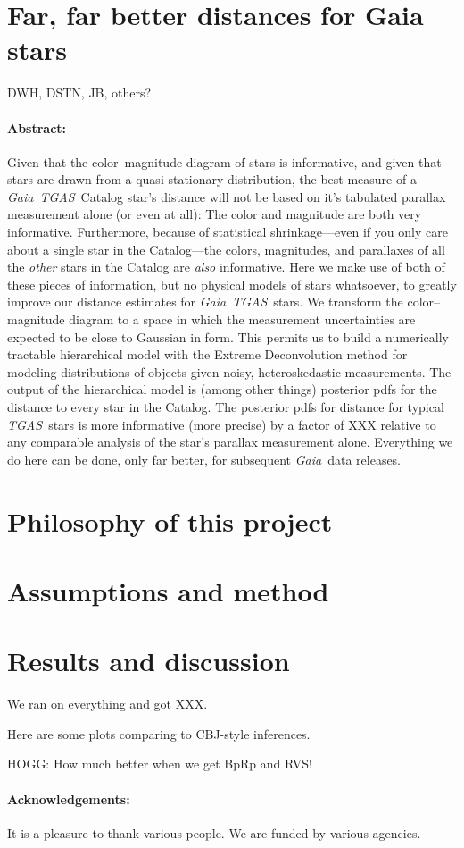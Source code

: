 \documentclass[12pt]{article}
\newcommand{\project}[1]{\textsl{#1}}
\newcommand{\acronym}[1]{\small{#1}}
\newcommand{\gaia}{\project{Gaia}}
\newcommand{\tgas}{\project{\acronym{TGAS}}}
\begin{document}
\section*{Far, far better distances for Gaia stars}

\noindent
DWH, DSTN, JB, others?

\paragraph{Abstract:}
Given that the color--magnitude diagram of stars is informative, and
given that stars are drawn from a quasi-stationary distribution, the
best measure of a \gaia\ \tgas\ Catalog star's distance will not be based on
it's tabulated parallax measurement alone (or even at all):
The color and magnitude are both very informative.
Furthermore, because of statistical shrinkage---even if you
only care about a single star in the Catalog---the colors, magnitudes,
and parallaxes of all the \emph{other} stars in the Catalog are \emph{also}
informative.
Here we make use of both of these pieces of information, but no
physical models of stars whatsoever, to greatly improve our distance
estimates for \gaia\ \tgas\ stars.
We transform the color--magnitude diagram to a space in which the
measurement uncertainties are expected to be close to Gaussian in
form.
This permits us to build a numerically tractable hierarchical model
with the Extreme Deconvolution method for modeling distributions of
objects given noisy, heteroskedastic measurements.
The output of the hierarchical model is (among other things) posterior
pdfs for the distance to every star in the Catalog.
The posterior pdfs for distance for typical \tgas\ stars is more
informative (more precise) by a factor of XXX relative to any
comparable analysis of the star's parallax measurement alone.
Everything we do here can be done, only far better, for subsequent
\gaia\ data releases.

\section{Philosophy of this project}

\section{Assumptions and method}

\section{Results and discussion}
We ran on everything and got XXX.

Here are some plots comparing to CBJ-style inferences.

HOGG: How much better when we get BpRp and RVS!

\paragraph{Acknowledgements:}
It is a pleasure to thank various people.
We are funded by various agencies.
\end{document}
